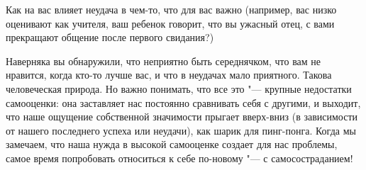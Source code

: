 \newpage


Как на вас влияет неудача в чем-то, что для вас важно (например, вас низко оценивают как учителя, ваш ребенок говорит, что вы ужасный отец, с вами прекращают общение после первого свидания?)

\vfill


\vspace{3ex}

Наверняка вы обнаружили, что неприятно быть середнячком, что вам не нравится, когда кто-то лучше вас, и что в неудачах мало приятного. Такова человеческая природа. Но важно понимать, что все это "--- крупные недостатки самооценки: она заставляет нас постоянно сравнивать себя с другими, и выходит, что наше ощущение собственной значимости прыгает вверх-вниз (в зависимости от нашего последнего успеха или неудачи), как шарик для пинг-понга. Когда мы замечаем, что наша нужда в высокой самооценке создает для нас проблемы, самое время попробовать относиться к себе по-новому "--- с самосостраданием! 

